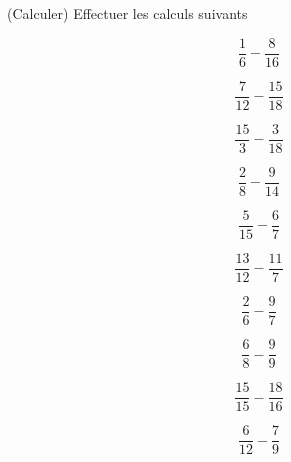  (Calculer) Effectuer les calculs suivants

\begin{multicols}{5}
$$\dfrac{1}{6}-\dfrac{8}{16}$$

$$\dfrac{7}{12}-\dfrac{15}{18}$$

$$\dfrac{15}{3}-\dfrac{3}{18}$$

$$\dfrac{2}{8}-\dfrac{9}{14}$$

$$\dfrac{5}{15}-\dfrac{6}{7}$$

$$\dfrac{13}{12}-\dfrac{11}{7}$$

$$\dfrac{2}{6}-\dfrac{9}{7}$$

$$\dfrac{6}{8}-\dfrac{9}{9}$$

$$\dfrac{15}{15}-\dfrac{18}{16}$$

$$\dfrac{6}{12}-\dfrac{7}{9}$$

\end{multicols}